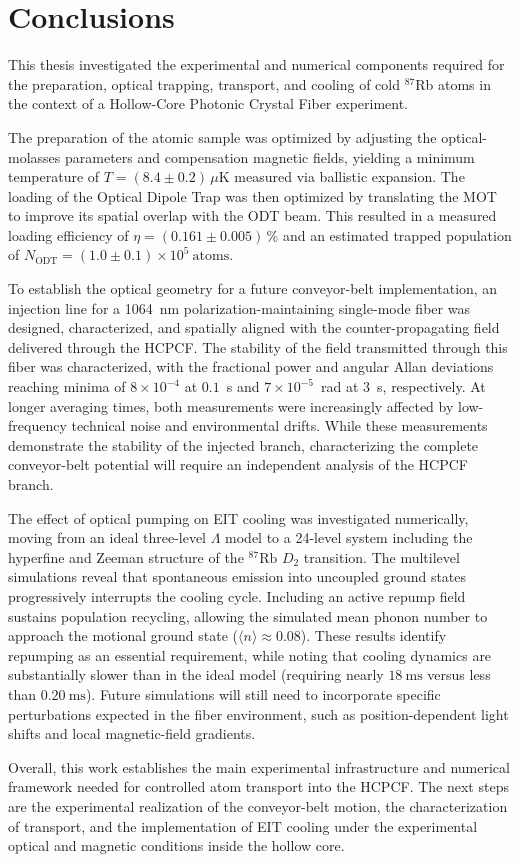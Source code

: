 \documentclass[../../thesis_main.tex]{subfiles}
\begin{document}
\chapter*{Conclusions}

This thesis investigated the experimental and numerical components required for the preparation, optical trapping, transport, and cooling of cold $^{87}$Rb atoms in the context of a Hollow-Core Photonic Crystal Fiber experiment.

The preparation of the atomic sample was optimized by adjusting the optical-molasses parameters and compensation magnetic fields, yielding a minimum temperature of $T = (8.4 \pm 0.2)\,\mu\text{K}$ measured via ballistic expansion. The loading of the Optical Dipole Trap was then optimized by translating the MOT to improve its spatial overlap with the ODT beam. This resulted in a measured loading efficiency of $\eta = (0.161 \pm 0.005)\,\%$ and an estimated trapped population of $N_{\mathrm{ODT}} = (1.0 \pm 0.1)\times 10^{5}\ \text{atoms}$.

To establish the optical geometry for a future conveyor-belt implementation, an injection line for a 1064~nm polarization-maintaining single-mode fiber was designed, characterized, and spatially aligned with the counter-propagating field delivered through the HCPCF. The stability of the field transmitted through this fiber was characterized, with the fractional power and angular Allan deviations reaching minima of $8\times10^{-4}$ at $0.1$~s and $7\times10^{-5}$~rad at $3$~s, respectively. At longer averaging times, both measurements were increasingly affected by low-frequency technical noise and environmental drifts. While these measurements demonstrate the stability of the injected branch, characterizing the complete conveyor-belt potential will require an independent analysis of the HCPCF branch.

The effect of optical pumping on EIT cooling was investigated numerically, moving from an ideal three-level $\Lambda$ model to a 24-level system including the hyperfine and Zeeman structure of the $^{87}\mathrm{Rb}$ $D_{2}$ transition. The multilevel simulations reveal that spontaneous emission into uncoupled ground states progressively interrupts the cooling cycle. Including an active repump field sustains population recycling, allowing the simulated mean phonon number to approach the motional ground state ($\langle n \rangle \approx 0.08$). These results identify repumping as an essential requirement, while noting that cooling dynamics are substantially slower than in the ideal model (requiring nearly $18~\mathrm{ms}$ versus less than $0.20~\mathrm{ms}$). Future simulations will still need to incorporate specific perturbations expected in the fiber environment, such as position-dependent light shifts and local magnetic-field gradients.

Overall, this work establishes the main experimental infrastructure and numerical framework needed for controlled atom transport into the HCPCF. The next steps are the experimental realization of the conveyor-belt motion, the characterization of transport, and the implementation of EIT cooling under the experimental optical and magnetic conditions inside the hollow core.
\end{document}
